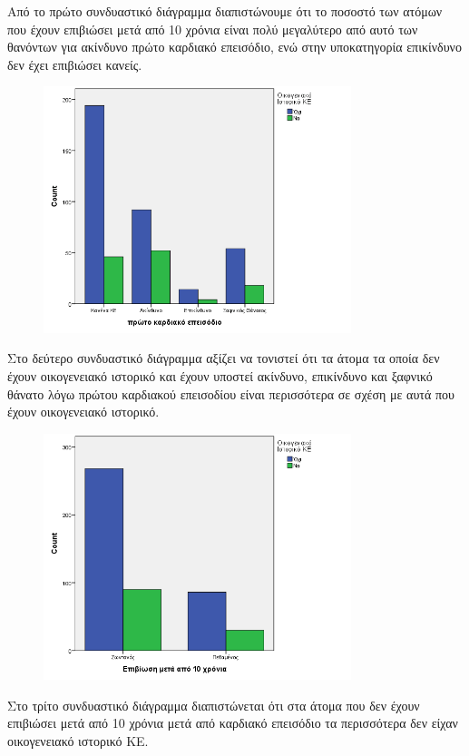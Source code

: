     Από το πρώτο συνδυαστικό διάγραμμα διαπιστώνουμε ότι το ποσοστό των ατόμων που έχουν επιβιώσει μετά από 10 χρόνια είναι πολύ μεγαλύτερο από αυτό των θανόντων για ακίνδυνο πρώτο καρδιακό επεισόδιο, ενώ στην υποκατηγορία επικίνδυνο δεν έχει επιβιώσει κανείς.  
    
    \clearpage
    \begin{figure}[hb]
        \centering
        \includegraphics[width=0.8\textwidth]{images/28.png}
    \end{figure}
    Στο δεύτερο συνδυαστικό διάγραμμα αξίζει να τονιστεί ότι τα άτομα τα οποία δεν έχουν οικογενειακό ιστορικό και έχουν υποστεί ακίνδυνο, επικίνδυνο και ξαφνικό θάνατο λόγω πρώτου καρδιακού επεισοδίου είναι περισσότερα σε σχέση με αυτά που έχουν οικογενειακό ιστορικό.
    
    \clearpage
    \begin{figure}[hb]
        \centering
        \includegraphics[width=0.8\textwidth]{images/29.png}
    \end{figure}
    
    Στο τρίτο συνδυαστικό διάγραμμα διαπιστώνεται ότι στα άτομα που δεν έχουν επιβιώσει μετά από 10 χρόνια μετά από καρδιακό επεισόδιο τα περισσότερα δεν είχαν οικογενειακό ιστορικό ΚΕ.  
